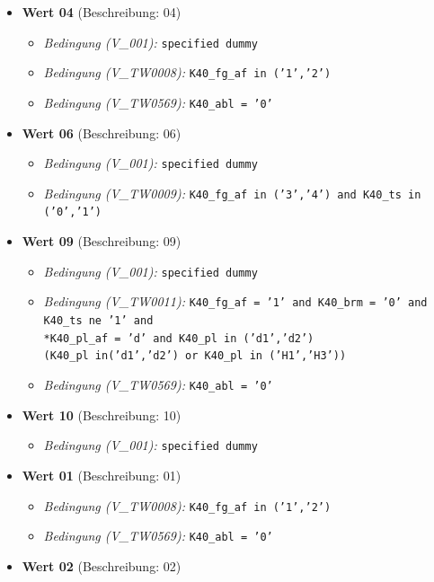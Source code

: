 \documentclass[12pt, a4paper, oneside]{book}
\begin{document}
\begin{itemize}
    \item \textbf{Wert 04} (Beschreibung: 04)
    \begin{itemize}
        \item \textit{Bedingung (V\_001):} \texttt{specified dummy}
        \item \textit{Bedingung (V\_TW0008):} \texttt{K40\_fg\_af in ('1','2')}
        \item \textit{Bedingung (V\_TW0569):} \texttt{K40\_abl = '0'}
    \end{itemize}
    \item \textbf{Wert 06} (Beschreibung: 06)
    \begin{itemize}
        \item \textit{Bedingung (V\_001):} \texttt{specified dummy}
        \item \textit{Bedingung (V\_TW0009):} \texttt{K40\_fg\_af in ('3','4') and K40\_ts in ('0','1')}
    \end{itemize}
    \item \textbf{Wert 09} (Beschreibung: 09)
    \begin{itemize}
        \item \textit{Bedingung (V\_001):} \texttt{specified dummy}
        \item \textit{Bedingung (V\_TW0011):} \texttt{K40\_fg\_af = '1' and K40\_brm = '0' and K40\_ts ne '1' and \\ 
        *K40\_pl\_af = 'd' and K40\_pl in ('d1','d2') \\ 
        (K40\_pl in('d1','d2') or K40\_pl in ('H1','H3'))}
        \item \textit{Bedingung (V\_TW0569):} \texttt{K40\_abl = '0'}
    \end{itemize}
    \item \textbf{Wert 10} (Beschreibung: 10)
    \begin{itemize}
        \item \textit{Bedingung (V\_001):} \texttt{specified dummy}
    \end{itemize}
    \item \textbf{Wert 01} (Beschreibung: 01)
    \begin{itemize}
        \item \textit{Bedingung (V\_TW0008):} \texttt{K40\_fg\_af in ('1','2')}
        \item \textit{Bedingung (V\_TW0569):} \texttt{K40\_abl = '0'}
    \end{itemize}
    \item \textbf{Wert 02} (Beschreibung: 02)

\end{itemize}
\end{document}
